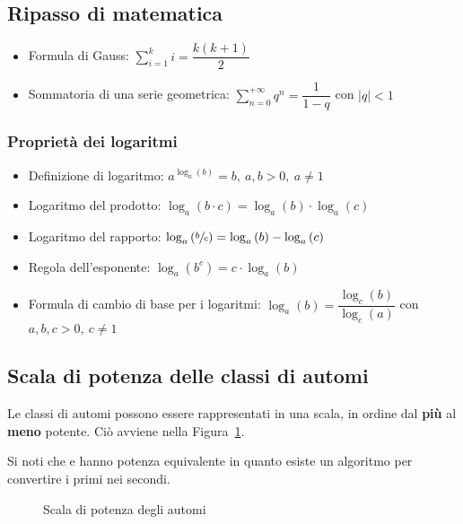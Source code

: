 \documentclass[italian, 10pt]{article}
\begin{document}
\subsection{Ripasso di matematica}

\begin{itemize}
  \item Formula di Gauss: \(\displaystyle \sum_{i=1}^k i = \dfrac{k(k+1)}{2}\)
  \item Sommatoria di una serie geometrica: \(\displaystyle \sum_{n=0}^{+\infty} q^n = \dfrac{1}{1-q}\) con \(|q| < 1\)
\end{itemize}

\subsubsection{Proprietà dei logaritmi}

\begin{itemize}
  \item Definizione di logaritmo:  \(a^{\log_a{(b)}} = b,\ a, b > 0,\ a \neq 1\)
  \item Logaritmo del prodotto: \(\log_a{(b \cdot c)} = \log_a{(b) \cdot \log_a{(c)}}\)
  \item Logaritmo del rapporto: \(\log_a{\left(\sfrac{b}{c}\right)} = \log_a{(b)} - \log_a{(c)}\)
  \item Regola dell'esponente: \(\log_a{\left(b^c\right)} = c \cdot \log_a{(b)}\)
  \item Formula di cambio di base per i logaritmi: \(\log_a{(b)} = \dfrac{\log_c{(b)}}{\log_c{(a)}}\) con \(a, b, c > 0,\ c \neq 1\)
\end{itemize}

\subsection{Scala di potenza delle classi di automi}

Le classi di automi possono essere rappresentati in una scala, in ordine dal \textbf{più} al \textbf{meno} potente.
Ciò avviene nella Figura~\ref{fig:scala-potenza-automi}.

Si noti che \NFA e \FSA hanno potenza equivalente in quanto esiste un algoritmo per convertire i primi nei secondi.

\begin{figure}[htbp]
  \bigskip
  \centering
  \caption{Scala di potenza degli automi}
  \label{fig:scala-potenza-automi}
  \bigskip
\end{figure}
\end{document}
